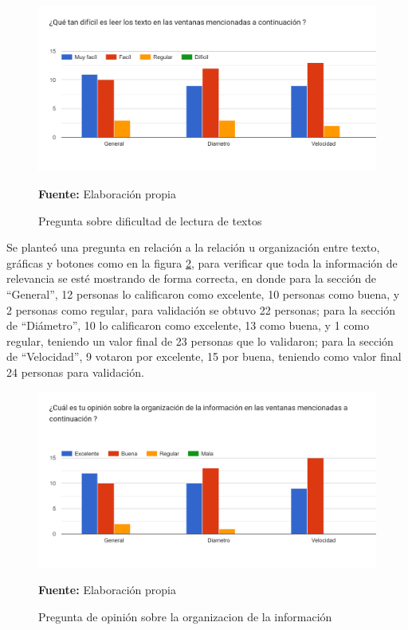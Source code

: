\documentclass[12pt,twocolumn,a4paper]{article}
\begin{document}
\begin{figure}
	\centering
	\includegraphics[scale=0.2]{Encuesta7.png}
	\caption{Pregunta sobre dificultad de lectura de textos} \textbf{Fuente:} Elaboración propia
	\label{Encuesta7}
\end{figure} 

Se planteó una pregunta en relación a la relación u organización entre texto, gráficas y botones como en la figura \ref{Encuesta8}, para verificar que toda la información de relevancia se esté mostrando de forma correcta, en donde para la sección de “General”, 12 personas lo calificaron como excelente, 10 personas como buena, y 2 personas como regular, para validación se obtuvo 22 personas; para la sección de “Diámetro”, 10 lo calificaron como excelente, 13 como  buena, y 1 como regular, teniendo un valor final de 23 personas que lo validaron; para la sección de “Velocidad”, 9 votaron por excelente, 15 por  buena, teniendo como valor final 24 personas para validación. 

\begin{figure}
	\centering
	\includegraphics[scale=0.2]{Encuesta8.png}
	\caption{Pregunta de opinión sobre la organizacion de la información } \textbf{Fuente:} Elaboración propia
	\label{Encuesta8}
\end{figure}
\end{document}
